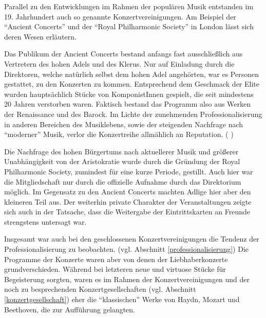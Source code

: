 \documentclass[a4paper, german, oneside]{scrbook}
\begin{document}
Parallel zu den Entwicklungen im Rahmen der populären Musik entstanden im 19. Jahrhundert auch so genannte Konzertvereinigungen. Am Beispiel der \enquote{Ancient Concerts} und der \enquote{Royal Philharmonic Society} in London lässt sich deren Wesen erläutern.

Das Publikum der Ancient Concerts bestand anfangs fast ausschließlich aus Vertretern des hohen Adels und des Klerus. Nur auf Einladung durch die Direktoren, welche natürlich selbst dem hohen Adel angehörten, war es Personen gestattet, zu den Konzerten zu kommen. Entsprechend dem Geschmack der Elite wurden hauptsächlich Stücke von KomponistInnen gespielt, die seit mindestens 20 Jahren verstorben waren. Faktisch bestand das Programm also aus Werken der Renaissance und des Barock. Im Lichte der zunehmenden Professionalisierung in anderen Bereichen des Musiklebens, sowie der steigenden Nachfrage nach \enquote{moderner} Musik, verlor die Konzertreihe allmählich an Reputation. (\cite[92ff.;]{muller_publikum_2014} \cite[73]{weber_music_2004})

Die Nachfrage des hohen Bürgertums nach aktuellerer Musik und größerer Unabhängigkeit von der Aristokratie wurde durch die Gründung der Royal Philharmonic Society, zumindest für eine kurze Periode, gestillt. Auch hier war die Mitgliedschaft nur durch die offizielle Aufnahme durch das Direktorium möglich. Im Gegensatz zu den Ancient Concerts machten Adlige hier aber den kleineren Teil aus. Der weiterhin private Charakter der Veranstaltungen zeigte sich auch in der Tatsache, dass die Weitergabe der Eintrittskarten an Freunde strengstens untersagt war. \parencite[vgl.][93]{muller_publikum_2014}

Insgesamt war auch bei den geschlossenen Konzertvereinigungen die Tendenz der Professionalisierung zu beobachten. (vgl. Abschnitt \ref{professionalisierung}) Die Programme der Konzerte waren aber von denen der Liebhaberkonzerte grundverschieden. Während bei letzteren neue und virtuose Stücke für Begeisterung sorgten, waren es im Rahmen der Konzertvereinigungen und der noch zu besprechenden Konzertgesellschaften (vgl. Abschnitt \ref{konzertgesellschaft}) eher die \enquote{klassischen} Werke von Haydn, Mozart und Beethoven, die zur Aufführung gelangten. \parencite[vgl.][22f.]{weber_music_2004}
\end{document}
